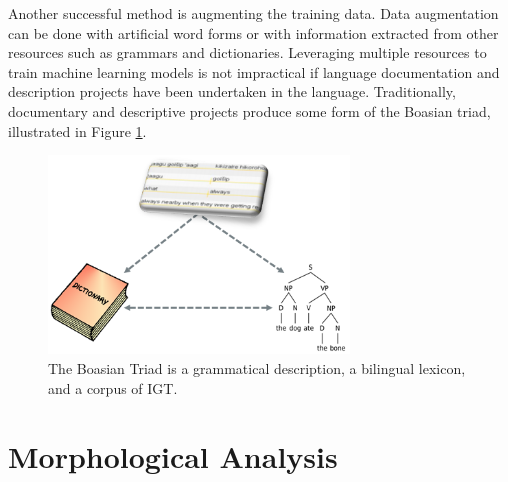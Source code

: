 Another successful method is augmenting the training data. 
Data augmentation can be done with artificial word forms \citep{liu_morphological_2018} or with information extracted from other resources such as grammars and dictionaries. Leveraging multiple resources to train machine learning models is not impractical if language documentation and description projects have been undertaken in the language. Traditionally, documentary and descriptive projects produce some form of the Boasian triad, illustrated in Figure \ref{fig:Triad}. 

\begin{figure}[h!]
\begin{center}
\includegraphics[width=8cm]{figs/Triad.PNG}
\caption[The Boasian Triad]{The Boasian Triad is a grammatical description, a bilingual lexicon, and a corpus of IGT.}
\label{fig:Triad}
\end{center}
\end{figure}


\section{Morphological Analysis}

